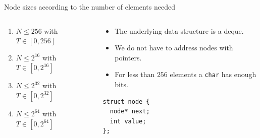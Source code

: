 \documentclass[10pt,aspectratio=169]{beamer}
\def\mbu{\node[style=mbu]}
\def\mbd{\node[style=mbd]}
\def\mbq{\node[style=mbq]}
\def\mbo{\node[style=mbo]}
\def\ebu{\node[style=ebu]}
\def\ebd{\node[style=ebd]}
\def\ebq{\node[style=ebq]}
\def\ebo{\node[style=ebo]}
\begin{document}
\begin{frame}[fragile]{Node sizes according to the number of elements needed}
\begin{columns}
\begin{column}{0.5\textwidth}
\begin{enumerate}
\item<alert@1> $N \le 256$ with $T \in [0, 256]$
\item<alert@2> $N \le 2^{16}$ with $T \in [0, 2^{16}]$
\item<alert@3> $N \le 2^{32}$ with $T \in [0, 2^{32}]$
\item<alert@4> $N \le 2^{64}$ with $T \in [0, 2^{64}]$
\end{enumerate}


\end{column}
\begin{column}{0.5\textwidth}

\begin{itemize}
\item The underlying data structure is a deque.
\item We do not have to address nodes with pointers.
\item For less than $256$ elements a \texttt{char} has enough bits.
\end{itemize}

\begin{lstlisting}
struct node {
  node* next;
  int value;
};

\end{lstlisting}

\end{column}
\end{columns}

\end{frame}
\end{document}
